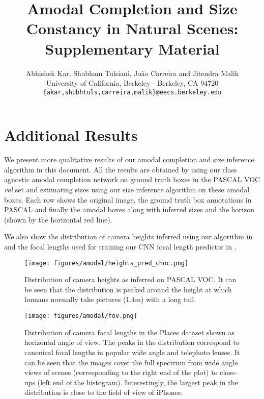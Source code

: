 \documentclass[10pt,twocolumn,letterpaper]{article}
\begin{document}
\title{Amodal Completion and Size Constancy in Natural Scenes:\\Supplementary Material}

\author{Abhishek Kar, Shubham Tulsiani, Jo\~{a}o Carreira and Jitendra Malik\\
University of California, Berkeley - Berkeley, CA 94720\\
{\tt\small \{akar,shubhtuls,carreira,malik\}@eecs.berkeley.edu}}

\maketitle
\section{Additional Results}
We present more qualitative results of our amodal completion and size inference algorithm in this document. All the results are obtained by using our class agnostic amodal completion network on ground truth boxes in the PASCAL VOC \textit{val} set and estimating sizes using our size inference algorithm on these amodal boxes. Each row shows the original image, the ground truth box annotations in PASCAL and finally the amodal boxes along with inferred sizes and the horizon (shown by the horizontal red line). 

We also show the distribution of camera heights inferred using our algorithm in  and the focal lengths used for training our CNN focal length predictor in .

\begin{figure}[b]
    \centering
    \texttt{[image: figures/amodal/heights\_pred\_choc.png]}
    \caption{ Distribution of camera heights as inferred on PASCAL VOC. It can be seen that the distribution is peaked around the height at which humans normally take pictures (1.4m) with a long tail.}
\end{figure}
\begin{figure}[t!]
    \centering
    \texttt{[image: figures/amodal/fov.png]}
    \caption{ Distribution of camera focal lengths in the Places dataset shown as horizontal angle of view. The peaks in the distribution correspond to canonical focal lengths in popular wide angle and telephoto lenses. It can be seen that the images cover the full spectrum from wide angle views of scenes (corresponding to the right end of the plot) to close-ups (left end of the histogram). Interestingly, the largest peak in the distribution is close to the field of view of iPhones.}
\end{figure}

\end{document}
